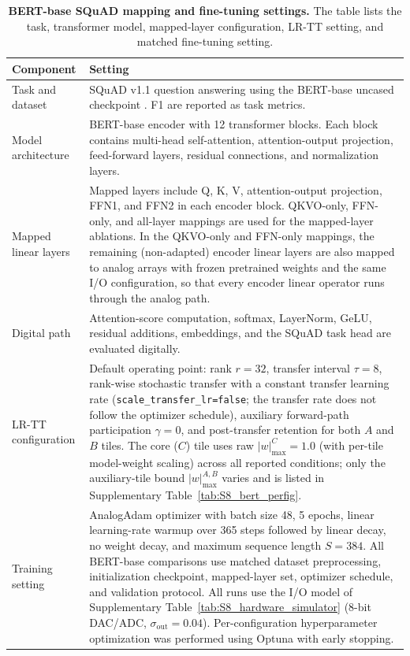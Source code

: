\documentclass[fleqn,10pt]{wlscirep}
\begin{document}
\begin{table}[!htbp]
\centering
\caption{\textbf{BERT-base SQuAD mapping and fine-tuning settings.}
The table lists the task, transformer model, mapped-layer configuration, LR-TT setting, and matched fine-tuning setting.}
\label{tab:S8_bert_training}
\small
\renewcommand{\arraystretch}{1.10}
\setlength{\tabcolsep}{4.0pt}
\begin{tabularx}{\linewidth}{p{3.0cm}Y}
\toprule
{}
\textbf{Component} & \textbf{Setting} \\
\midrule
Task and dataset &
SQuAD v1.1 question answering using the BERT-base uncased checkpoint \cite{devlin2019bert,rajpurkar2016squad}. F1 are reported as task metrics. \\
\midrule
Model architecture &
BERT-base encoder with 12 transformer blocks. Each block contains multi-head self-attention, attention-output projection, feed-forward layers, residual connections, and normalization layers. \\
\midrule
Mapped linear layers &
Mapped layers include Q, K, V, attention-output projection, FFN1, and FFN2 in each encoder block. QKVO-only, FFN-only, and all-layer mappings are used for the mapped-layer ablations. In the QKVO-only and FFN-only mappings, the remaining (non-adapted) encoder linear layers are also mapped to analog arrays with frozen pretrained weights and the same I/O configuration, so that every encoder linear operator runs through the analog path. \\
\midrule
Digital path &
Attention-score computation, softmax, LayerNorm, GeLU, residual additions, embeddings, and the SQuAD task head are evaluated digitally. \\
\midrule
LR-TT configuration &
Default operating point: rank \(r=32\), transfer interval \(\tau=8\), rank-wise stochastic transfer with a constant transfer learning rate (\texttt{scale\_transfer\_lr=false}; the transfer rate does not follow the optimizer schedule), auxiliary forward-path participation \(\gamma=0\), and post-transfer retention for both \(A\) and \(B\) tiles. The core ($C$) tile uses raw $|w|_{\max}^{C}=1.0$ (with per-tile model-weight scaling) across all reported conditions; only the auxiliary-tile bound $|w|_{\max}^{A,B}$ varies and is listed in Supplementary Table~\ref{tab:S8_bert_perfig}. \\
\midrule
Training setting &
AnalogAdam optimizer with batch size 48, 5 epochs, linear learning-rate warmup over 365 steps followed by linear decay, no weight decay, and maximum sequence length \(S=384\). All BERT-base comparisons use matched dataset preprocessing, initialization checkpoint, mapped-layer set, optimizer schedule, and validation protocol. All runs use the I/O model of Supplementary Table~\ref{tab:S8_hardware_simulator} (8-bit DAC/ADC, \(\sigma_{\mathrm{out}}=0.04\)). Per-configuration hyperparameter optimization was performed using Optuna with early stopping. \\
\bottomrule
\end{tabularx}
\end{table}
\FloatBarrier
\end{document}
